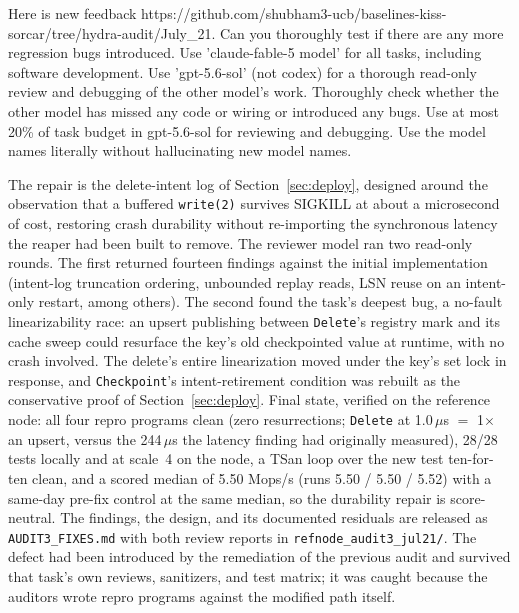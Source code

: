 \documentclass{article}
\newenvironment{promptbox}{\begin{mdframed}[linewidth=0.4pt,linecolor=black,innerleftmargin=5pt,innerrightmargin=5pt,innertopmargin=5pt,innerbottommargin=5pt,skipabove=2pt,skipbelow=5pt]\setlength{\parskip}{0pt}\setlength{\parindent}{0pt}\ttfamily\scriptsize\raggedright\frenchspacing\obeylines\leavevmode\strut\ignorespaces}{\end{mdframed}}
\newcommand{\HydraFinalWL}{5.50}        %
\newcommand{\HydraFinalWLRuns}{5.50 / 5.50 / 5.52}
\begin{document}
\begin{promptbox}
Here is new feedback https://github.com/shubham3-ucb/baselines-kiss-sorcar/tree/hydra-audit/July\_21.  Can you thoroughly test if there are any more regression bugs introduced.  Use 'claude-fable-5 model' for all tasks, including software development. Use 'gpt-5.6-sol' (not codex) for a thorough read-only review and debugging of the other model's work. Thoroughly check whether the other model has missed any code or wiring or introduced any bugs. Use at most 20\% of task budget in gpt-5.6-sol for reviewing and debugging. Use the model names literally without hallucinating new model names.
\end{promptbox}

The repair is the delete-intent log of Section~\ref{sec:deploy}, designed around the observation that a buffered \texttt{write(2)} survives SIGKILL at about a microsecond of cost, restoring crash durability without re-importing the synchronous latency the reaper had been built to remove. The reviewer model ran two read-only rounds. The first returned fourteen findings against the initial implementation (intent-log truncation ordering, unbounded replay reads, LSN reuse on an intent-only restart, among others). The second found the task's deepest bug, a no-fault linearizability race: an upsert publishing between \texttt{Delete}'s registry mark and its cache sweep could resurface the key's old checkpointed value at runtime, with no crash involved. The delete's entire linearization moved under the key's set lock in response, and \texttt{Checkpoint}'s intent-retirement condition was rebuilt as the conservative proof of Section~\ref{sec:deploy}. Final state, verified on the reference node: all four repro programs clean (zero resurrections; \texttt{Delete} at 1.0\,$\mu$s $=$ 1$\times$ an upsert, versus the 244\,$\mu$s the latency finding had originally measured), 28/28 tests locally and at scale~4 on the node, a TSan loop over the new test ten-for-ten clean, and a scored median of \HydraFinalWL{} Mops/s (runs \HydraFinalWLRuns) with a same-day pre-fix control at the same median, so the durability repair is score-neutral. The findings, the design, and its documented residuals are released as \texttt{AUDIT3\_FIXES.md} with both review reports in \texttt{refnode\_audit3\_jul21/}. The defect had been introduced by the remediation of the previous audit and survived that task's own reviews, sanitizers, and test matrix; it was caught because the auditors wrote repro programs against the modified path itself.
\end{document}
